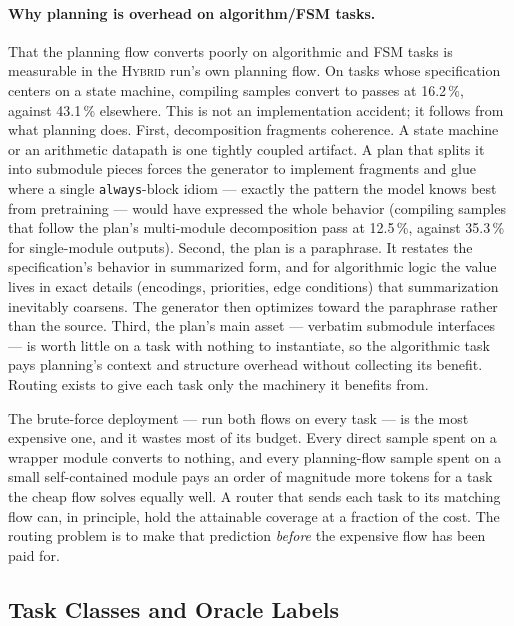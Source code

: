 \paragraph{Why planning is overhead on algorithm/FSM tasks.}
That the planning flow converts poorly on algorithmic and FSM tasks is
measurable in the \textsc{Hybrid} run's own planning flow. On tasks
whose specification centers on a state machine, compiling samples
convert to passes at 16.2\,\%, against 43.1\,\% elsewhere. This is not
an implementation accident; it follows from what planning does. First,
decomposition fragments coherence. A state machine or an arithmetic
datapath is one tightly coupled artifact. A plan that splits it into
submodule pieces forces the generator to implement fragments and glue
where a single \texttt{always}-block idiom --- exactly the pattern the
model knows best from pretraining --- would have expressed the whole
behavior (compiling samples that follow the plan's multi-module
decomposition pass at 12.5\,\%, against 35.3\,\% for single-module
outputs). Second, the plan is a paraphrase. It restates the
specification's behavior in summarized form, and for algorithmic logic
the value lives in exact details (encodings, priorities, edge conditions)
that summarization inevitably coarsens. The generator then optimizes
toward the paraphrase rather than the source. Third, the plan's main
asset --- verbatim submodule interfaces --- is worth little on a task
with nothing to instantiate, so the algorithmic task pays planning's
context and structure overhead without collecting its benefit. Routing
exists to give each task only the machinery it benefits from.

The brute-force deployment --- run both flows on every task --- is the
most expensive one, and it wastes most of its budget. Every direct
sample spent on a wrapper module converts to nothing, and every
planning-flow sample spent on a small self-contained module pays an order of
magnitude more tokens for a task the cheap flow solves equally well. A
router that sends each task to its matching flow can, in principle,
hold the attainable coverage at a fraction of the cost. The routing
problem is to make that prediction \emph{before} the expensive flow has
been paid for.

\subsection{Task Classes and Oracle Labels}
\label{sec:router-classes}

